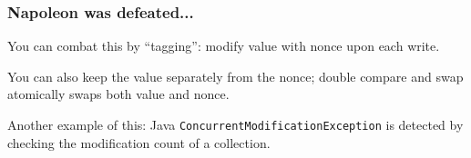 \begin{frame}
\frametitle{Napoleon was defeated...}

You can combat this by ``tagging'': modify value with nonce upon each
write.  

You can also keep the value separately from the nonce; double
compare and swap atomically swaps both value and nonce.

Another example of this: Java \texttt{ConcurrentModificationException} is detected by checking the modification count of a collection.

\end{frame}




